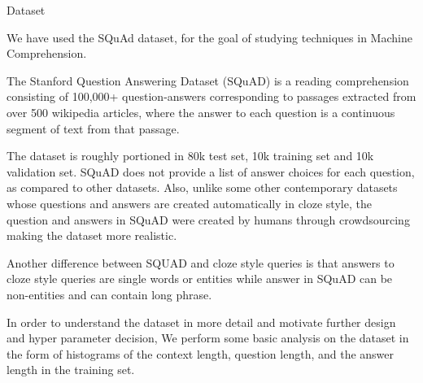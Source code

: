 \documentclass{article}
\begin{document}
\begin{psection}{Dataset}

	We have used the SQuAd \citep{squad} dataset, for the goal of studying techniques in Machine Comprehension.

	The Stanford Question Answering Dataset (SQuAD) is a reading comprehension consisting of 100,000+ question-answers corresponding to passages extracted from over 500 wikipedia articles, where the answer to each question is a continuous segment of text from that passage.

	The dataset is roughly portioned in 80k test set, 10k training set and 10k validation set.
	SQuAD does not provide a list of answer choices for each question, as compared to other datasets.
	Also, unlike some other contemporary datasets whose questions and answers are created automatically in cloze style, the question and answers in SQuAD were created by humans through crowdsourcing making the dataset more realistic.

	Another difference between SQUAD and cloze style queries is that answers to cloze style queries are single words or entities while answer in SQuAD can be non-entities and can contain long phrase.

	In order to understand the dataset in more detail and motivate further design and hyper parameter decision, We perform some basic analysis on the dataset in the form of histograms of the context length, question length, and the answer length in the training set.


\end{psection}
\end{document}
